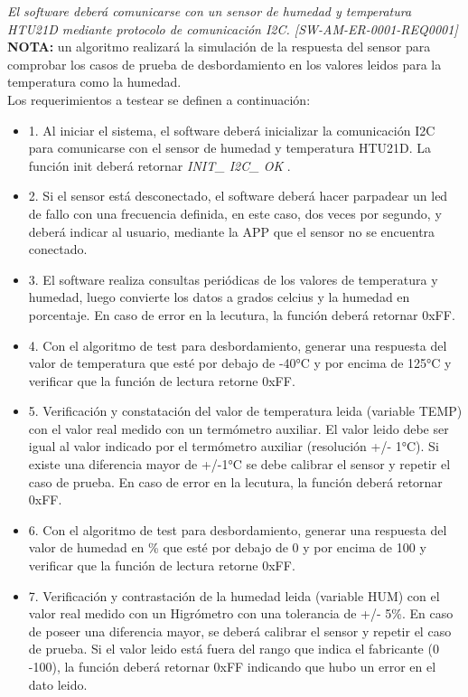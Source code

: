 \documentclass[11pt]{article}
\begin{document}
\newpage
\vspace{2cm}
\textit{El software deberá comunicarse con un sensor de humedad y temperatura HTU21D mediante protocolo de comunicación I2C.
[SW-AM-ER-0001-REQ0001]}
\vspace{2cm}
\\ \textbf{NOTA:} un algoritmo realizará la simulación de la respuesta del sensor para comprobar los casos de prueba de desbordamiento en los valores leidos para la temperatura como la humedad.
\vspace{2cm}
\\Los requerimientos a testear se definen a continuación:
\begin{itemize}
\item 1. Al iniciar el sistema, el software deberá inicializar la comunicación I2C para comunicarse con el sensor de humedad y temperatura HTU21D. La función init deberá retornar \textit{INIT\_ I2C\_ OK }. 
\item 2. Si el sensor está desconectado, el software deberá hacer parpadear un led de fallo con una frecuencia  definida, en este caso, dos veces por segundo,  y deberá indicar al usuario, mediante la APP que el sensor no se encuentra conectado.
\item 3. El software realiza consultas periódicas de los valores de temperatura y humedad, luego convierte los datos a grados celcius y la humedad en porcentaje. En caso de error en la lecutura, la función deberá retornar 0xFF.
\item 4. Con el algoritmo de test para desbordamiento, generar una respuesta del valor de temperatura que esté por debajo de -40°C y por encima de 125°C y verificar que la función de lectura retorne 0xFF.
\item 5. Verificación y constatación del valor de temperatura leida (variable TEMP) con el valor real medido con un termómetro auxiliar. El valor leido debe ser igual al valor indicado por el termómetro auxiliar (resolución +/- 1°C). Si existe una diferencia mayor de +/-1°C se debe calibrar el sensor y repetir el caso de prueba. En caso de error en la lecutura, la función deberá retornar 0xFF.
\item 6. Con el algoritmo de test para desbordamiento, generar una respuesta del valor de humedad en \% que esté por debajo de 0 y por encima de 100 y verificar que la función de lectura retorne 0xFF.
\item 7. Verificación y contrastación de la humedad leida (variable HUM) con el valor real medido con un Higrómetro con una tolerancia de +/- 5\%. En caso de poseer una diferencia mayor, se deberá calibrar el sensor y repetir el caso de prueba. Si el valor leido está fuera del rango que indica el fabricante (0 -100), la función deberá retornar 0xFF indicando que hubo un error en el dato leido.
\end{itemize}
\end{document}

